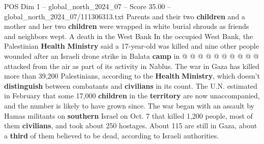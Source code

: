 \begin{textsample}{POS Dim 1 – global\_north\_2024\_07 – Score 35.00 – global\_north\_2024\_07/111306313.txt}
Parents and their two \textbf{children} and a mother and her two \textbf{children} were wrapped in white burial shrouds as friends and neighbors wept.
A death in the West Bank In the occupied West Bank, the Palestinian \textbf{Health} \textbf{Ministry} said a 17-year-old was killed and nine other people wounded after an Israeli drone strike in Balata \textbf{camp} in @ @ @ @ @ @ @ @ @ @ attacked from the air as part of its activity in Nablus.
The war in Gaza has killed more than 39,200 Palestinians, according to the \textbf{Health} \textbf{Ministry}, which doesn't \textbf{distinguish} between combatants and \textbf{civilians} in its count.
The U.N. estimated in February that some 17,000 \textbf{children} in the \textbf{territory} are now unaccompanied, and the number is likely to have grown since.
The war began with an assault by Hamas militants on \textbf{southern} Israel on Oct. 7 that killed 1,200 people, most of them \textbf{civilians}, and took about 250 hostages.
About 115 are still in Gaza, about a \textbf{third} of them believed to be dead, according to Israeli authorities.

\end{textsample}
